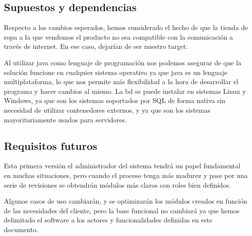 \subsection{Supuestos y dependencias}
Respecto a los cambios esperados, hemos considerado el hecho de que la tienda de ropa a
la que vendemos el producto no sea compatible con la comunicación a través de
internet. En ese caso, dejarían de ser nuestro target.

Al utilizar java como lenguaje de programación nos podemos asegurar de que la solución funcione en cualquier sistema operativo ya que java es un lenguaje multiplataforma, lo que nos permite más flexibilidad a la hora de desarrollar el programa y hacer cambios al mismo. La \gls{bd} se puede instalar en sistemas Linux y Windows, ya que son los sistemas soportados por SQL de forma nativa sin necesidad de utilizar contenedores externos, y ya que son los sistemas mayoritariamente usados para servidores.

\subsection{Requisitos futuros}
Esta primera versión el administrador del sistema tendrá un papel fundamental en
muchas situaciones, pero cuando el proceso tenga más madurez y pase por una serie
de revisiones se obtendrán módulos más claros con roles bien definidos.

Algunos casos de uso cambiarán, y se optimizarán los módulos creados en función de
las necesidades del cliente, pero la base funcional no cambiará ya que hemos
delimitado el software a los actores y funcionalidades definidas en este documento.
